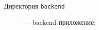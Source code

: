 \documentclass[diploma]{SCWorks}
\begin{document}
\begin{description}
\item[Директория \texttt{backend}] — backend-приложение;

\end{description}
\end{document}

